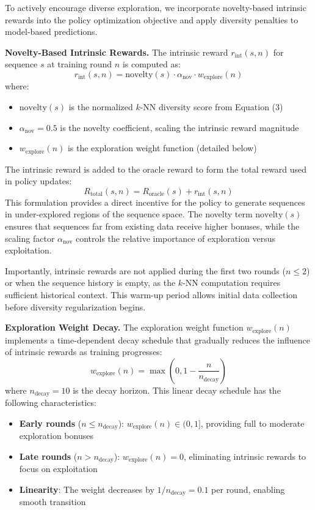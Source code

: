 \documentclass[conference]{IEEEtran}
\begin{document}
To actively encourage diverse exploration, we incorporate novelty-based intrinsic rewards into the policy optimization objective and apply diversity penalties to model-based predictions.

\textbf{Novelty-Based Intrinsic Rewards.} The intrinsic reward $r_{\text{int}}(s, n)$ for sequence $s$ at training round $n$ is computed as:
%
\begin{equation}
r_{\text{int}}(s, n) = \text{novelty}(s) \cdot \alpha_{\text{nov}} \cdot w_{\text{explore}}(n)
\end{equation}
%
where:
\begin{itemize}
    \item $\text{novelty}(s)$ is the normalized $k$-NN diversity score from Equation (3)
    \item $\alpha_{\text{nov}} = 0.5$ is the novelty coefficient, scaling the intrinsic reward magnitude
    \item $w_{\text{explore}}(n)$ is the exploration weight function (detailed below)
\end{itemize}

The intrinsic reward is added to the oracle reward to form the total reward used in policy updates:
%
\begin{equation}
R_{\text{total}}(s, n) = R_{\text{oracle}}(s) + r_{\text{int}}(s, n)
\end{equation}
%
This formulation provides a direct incentive for the policy to generate sequences in under-explored regions of the sequence space. The novelty term $\text{novelty}(s)$ ensures that sequences far from existing data receive higher bonuses, while the scaling factor $\alpha_{\text{nov}}$ controls the relative importance of exploration versus exploitation.

Importantly, intrinsic rewards are not applied during the first two rounds ($n \leq 2$) or when the sequence history is empty, as the $k$-NN computation requires sufficient historical context. This warm-up period allows initial data collection before diversity regularization begins.

\textbf{Exploration Weight Decay.} The exploration weight function $w_{\text{explore}}(n)$ implements a time-dependent decay schedule that gradually reduces the influence of intrinsic rewards as training progresses:
%
\begin{equation}
w_{\text{explore}}(n) = \max\left(0, 1 - \frac{n}{n_{\text{decay}}}\right)
\end{equation}
%
where $n_{\text{decay}} = 10$ is the decay horizon. This linear decay schedule has the following characteristics:
\begin{itemize}
    \item \textbf{Early rounds} ($n \leq n_{\text{decay}}$): $w_{\text{explore}}(n) \in (0, 1]$, providing full to moderate exploration bonuses
    \item \textbf{Late rounds} ($n > n_{\text{decay}}$): $w_{\text{explore}}(n) = 0$, eliminating intrinsic rewards to focus on exploitation
    \item \textbf{Linearity}: The weight decreases by $1/n_{\text{decay}} = 0.1$ per round, enabling smooth transition
\end{itemize}
\end{document}
